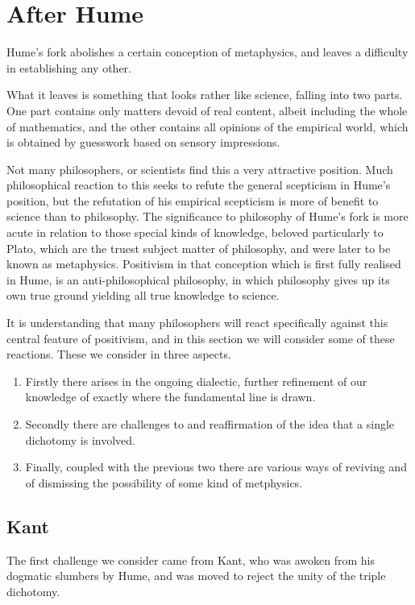\section{After Hume}\label{After}

Hume's fork abolishes a certain conception of metaphysics, and leaves a difficulty in establishing any other.

What it leaves is something that looks rather like science, falling into two parts.
One part contains only matters devoid of real content, albeit including the whole of mathematics, and the other contains all opinions of the empirical world, which is obtained by guesswork based on sensory impressions.

Not many philosophers, or scientists find this a very attractive position.
Much philosophical reaction to this seeks to refute the general scepticism in Hume's position, but the refutation of his empirical scepticism is more of benefit to science than to philosophy.
The significance to philosophy of Hume's fork is more acute in relation to those special kinds of knowledge, beloved particularly to Plato, which are the truest subject matter of philosophy, and were later to be known as metaphysics.
Positivism in that conception which is first fully realised in Hume, is an anti-philosophical philosophy, in which philosophy gives up its own true ground yielding all true knowledge to science.

It is understanding that many philosophers will react specifically against this central feature of positivism,
and in this section we will consider some of these reactions.
These we consider in three aspects.
\begin{enumerate}
\item
Firstly there arises in the ongoing dialectic, further refinement of our knowledge of exactly where the fundamental line is drawn.
\item
Secondly there are challenges to and reaffirmation of the idea that a single dichotomy is involved.
\item
Finally, coupled with the previous two there are various ways of reviving and of dismissing the possibility of some kind of metphysics.
\end{enumerate}

\subsection{Kant}

The first challenge we consider came from Kant, who was awoken from his dogmatic slumbers by Hume, and was moved to reject the unity of the triple dichotomy.
